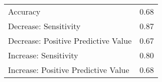 \begin{table}[ht]
\centering
\begin{tabular}{lr}
  \hline
 &  \\ 
  \hline
Accuracy & 0.68 \\ 
  Decrease: Sensitivity & 0.87 \\ 
  Decrease: Positive Predictive Value & 0.67 \\ 
  Increase: Sensitivity & 0.80 \\ 
  Increase: Positive Predictive Value & 0.68 \\ 
   \hline
\end{tabular}
\end{table}
